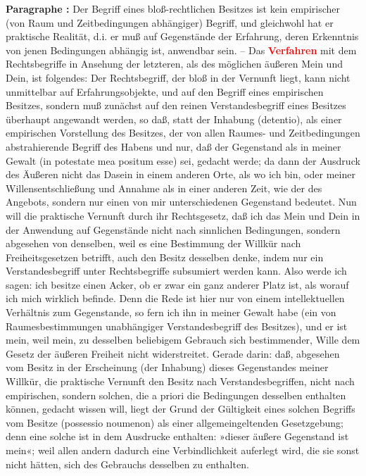 \documentclass[a4paper,12pt,twoside]{book}
\newcommand{\match}[1]{\textcolor{red}{\textbf{#1}}}
\begin{document}
	\textbf{Paragraphe : }Der Begriff eines bloß-rechtlichen Besitzes ist kein empirischer (von Raum und Zeitbedingungen abhängiger) Begriff, und gleichwohl hat er praktische Realität, d.i. er muß auf Gegenstände der Erfahrung, deren Erkenntnis von jenen Bedingungen abhängig ist, anwendbar sein. – Das \match{Verfahren} mit dem Rechtsbegriffe in Ansehung der letzteren, als des möglichen äußeren Mein und Dein, ist folgendes: Der Rechtsbegriff, der bloß in der Vernunft liegt, kann nicht unmittelbar auf Erfahrungsobjekte, und auf den Begriff eines empirischen Besitzes, sondern muß zunächst auf den reinen Verstandesbegriff eines Besitzes überhaupt angewandt werden, so daß, statt der Inhabung (detentio), als einer empirischen Vorstellung des Besitzes, der von allen Raumes- und Zeitbedingungen abstrahierende Begriff des Habens und nur, daß der Gegenstand als in meiner Gewalt (in potestate mea positum esse) sei, gedacht werde; da dann der Ausdruck des Äußeren nicht das Dasein in einem anderen Orte, als wo ich bin, oder meiner Willensentschließung und Annahme als in einer anderen Zeit, wie der des Angebots, sondern nur einen von mir unterschiedenen Gegenstand bedeutet. Nun will die praktische Vernunft durch ihr Rechtsgesetz, daß ich das Mein und Dein in der Anwendung auf Gegenstände nicht nach sinnlichen Bedingungen, sondern abgesehen von denselben, weil es eine Bestimmung der Willkür nach Freiheitsgesetzen betrifft, auch den Besitz desselben denke, indem nur ein Verstandesbegriff unter Rechtsbegriffe subsumiert werden kann. Also werde ich sagen: ich besitze einen Acker, ob er zwar ein ganz anderer Platz ist, als worauf ich mich wirklich befinde. Denn die Rede ist hier nur von einem intellektuellen Verhältnis zum Gegenstande, so fern ich ihn in meiner Gewalt habe (ein von Raumesbestimmungen unabhängiger Verstandesbegriff des Besitzes), und er ist mein,  weil mein, zu desselben beliebigem Gebrauch sich bestimmender, Wille dem Gesetz der äußeren Freiheit nicht widerstreitet. Gerade darin: daß, abgesehen vom Besitz in der Erscheinung (der Inhabung) dieses Gegenstandes meiner Willkür, die praktische Vernunft den Besitz nach Verstandesbegriffen, nicht nach empirischen, sondern solchen, die a priori die Bedingungen desselben enthalten können, gedacht wissen will, liegt der Grund der Gültigkeit eines solchen Begriffs vom Besitze (possessio noumenon) als einer allgemeingeltenden Gesetzgebung; denn eine solche ist in dem Ausdrucke enthalten: »dieser äußere Gegenstand ist mein«; weil allen andern dadurch eine Verbindlichkeit auferlegt wird, die sie sonst nicht hätten, sich des Gebrauchs desselben zu enthalten. 
	
\end{document}
